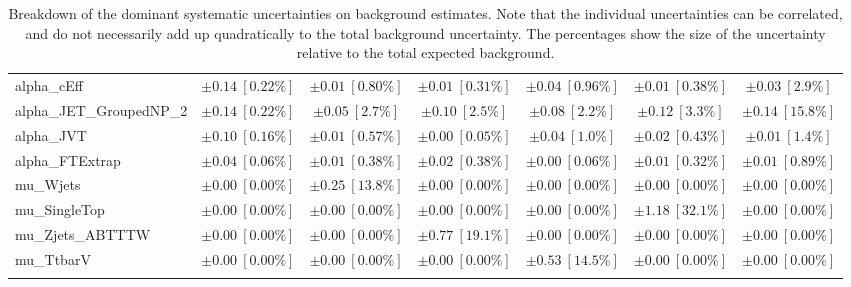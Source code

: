 \begin{sidewaystable}
\begin{center}
\begin{tabular*}{\textwidth}{@{\extracolsep{\fill}}lcccccc}
alpha\_cEff         & $\pm 0.14\ [0.22\%] $          & $\pm 0.01\ [0.80\%] $          & $\pm 0.01\ [0.31\%] $          & $\pm 0.04\ [0.96\%] $          & $\pm 0.01\ [0.38\%] $          & $\pm 0.03\ [2.9\%] $       \\
alpha\_JET\_GroupedNP\_2         & $\pm 0.14\ [0.22\%] $          & $\pm 0.05\ [2.7\%] $          & $\pm 0.10\ [2.5\%] $          & $\pm 0.08\ [2.2\%] $          & $\pm 0.12\ [3.3\%] $          & $\pm 0.14\ [15.8\%] $       \\
alpha\_JVT         & $\pm 0.10\ [0.16\%] $          & $\pm 0.01\ [0.57\%] $          & $\pm 0.00\ [0.05\%] $          & $\pm 0.04\ [1.0\%] $          & $\pm 0.02\ [0.43\%] $          & $\pm 0.01\ [1.4\%] $       \\
alpha\_FTExtrap         & $\pm 0.04\ [0.06\%] $          & $\pm 0.01\ [0.38\%] $          & $\pm 0.02\ [0.38\%] $          & $\pm 0.00\ [0.06\%] $          & $\pm 0.01\ [0.32\%] $          & $\pm 0.01\ [0.89\%] $       \\
mu\_Wjets         & $\pm 0.00\ [0.00\%] $          & $\pm 0.25\ [13.8\%] $          & $\pm 0.00\ [0.00\%] $          & $\pm 0.00\ [0.00\%] $          & $\pm 0.00\ [0.00\%] $          & $\pm 0.00\ [0.00\%] $       \\
mu\_SingleTop         & $\pm 0.00\ [0.00\%] $          & $\pm 0.00\ [0.00\%] $          & $\pm 0.00\ [0.00\%] $          & $\pm 0.00\ [0.00\%] $          & $\pm 1.18\ [32.1\%] $          & $\pm 0.00\ [0.00\%] $       \\
mu\_Zjets\_ABTTTW         & $\pm 0.00\ [0.00\%] $          & $\pm 0.00\ [0.00\%] $          & $\pm 0.77\ [19.1\%] $          & $\pm 0.00\ [0.00\%] $          & $\pm 0.00\ [0.00\%] $          & $\pm 0.00\ [0.00\%] $       \\
mu\_TtbarV         & $\pm 0.00\ [0.00\%] $          & $\pm 0.00\ [0.00\%] $          & $\pm 0.00\ [0.00\%] $          & $\pm 0.53\ [14.5\%] $          & $\pm 0.00\ [0.00\%] $          & $\pm 0.00\ [0.00\%] $       \\
\noalign{\smallskip}\hline\noalign{\smallskip}
\end{tabular*}
\end{center}
\caption[Breakdown of uncertainty on background estimates]{
Breakdown of the dominant systematic uncertainties on background estimates.
Note that the individual uncertainties can be correlated, and do not necessarily add up quadratically to 
the total background uncertainty. The percentages show the size of the uncertainty relative to the total expected background.
\label{table.results.bkgestimate.uncertainties.VRTopATT_bybkg}}
\end{sidewaystable}
%